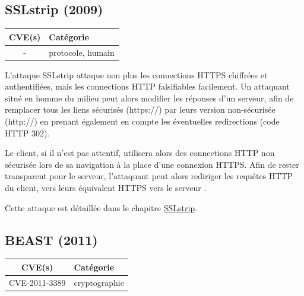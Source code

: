 

\subsection{SSLstrip (2009)}

\begin{tabularx}{0.96\textwidth}{|c|X|}
  \hline
  \textbf{CVE(s)} & \textbf{Catégorie} \\
  \hline
  - & protocole, humain \\
  \hline
\end{tabularx}

\vspace{1em}

L'attaque SSLstrip attaque non plus les connections HTTPS chiffrées et authentifiées, mais les connections HTTP falsifiables facilement. Un attaquant situé en homme du milieu peut alors modifier les réponses d'un serveur, afin de remplacer tous les liens sécurisés (https://) par leurs version non-sécurisée (http://) en prenant également en compte les éventuelles redirections (code HTTP 302).

Le client, si il n'est pas attentif, utilisera alors des connections HTTP non sécurisée lors de sa navigation à la place d'une connexion HTTPS. Afin de rester transparent pour le serveur, l'attaquant peut alors rediriger les requêtes HTTP du client, vers leurs équivalent HTTPS vers le serveur \cite{sslstrip-website}.

Cette attaque est détaillée dans le chapitre \hyperref[sec:sslstrip]{SSLstrip}.



\subsection{BEAST (2011)}

\begin{tabularx}{0.96\textwidth}{|c|X|}
  \hline
  \textbf{CVE(s)} & \textbf{Catégorie} \\
  \hline
  CVE-2011-3389 & cryptographie \\
  \hline
\end{tabularx}

\vspace{1em}

